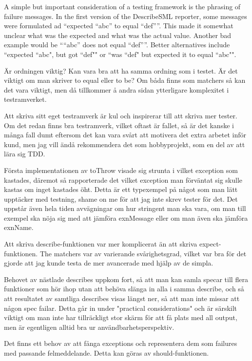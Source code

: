 \documentclass[11pt]{article}
\begin{document}
A simple but important consideration of a testing framework is the phrasing of failure messages. In the first version of the DescribeSML reporter, some messages were formulated ad ``expected ``abc'' to equal ``def''''. This made it somewhat unclear what was the expected and what was the actual value. Another bad example would be ````abc'' does not equal ``def''''. Better alternatives include ``expected ``abc", but got ``def"" or ``was ``def" but expected it to equal ``abc"".

Är ordningen viktig? Kan vara bra att ha samma ordning som i testet. Är det viktigt om man skriver to equal eller to be? Om båda finns som matchers så kan det vara viktigt, men då tillkommer å andra sidan ytterligare komplexitet i testramverket.

Att skriva sitt eget testramverk är kul och inspirerar till att skriva mer tester. Om det redan finns bra testramverk, vilket oftast är fallet, så är det kanske i många fall dumt eftersom det kan vara svårt att motivera det extra arbetet inför kund, men jag vill ändå rekommendera det som hobbyprojekt, som en del av att lära sig TDD.

Första implementationen av toThrow visade sig strunta i vilket exception som kastades, däremot så rapporterade det vilket exception man förväntat sig skulle kastas om inget kastades öht. Detta är ett typexempel på något som man lätt upptäcker med testning, shame on me för att jag inte skrev tester för det. Det uppstår även hela tiden avvägningar om hur stringent man ska vara, om man till exempel ska nöja sig med att jämföra exnMessage eller om man även ska jämföra exnName.

Att skriva describe-funktionen var mer komplicerat än att skriva expect-funktionen. The matchers var av varierande svårighetsgrad, vilket var bra för det gjorde att jag kunde testa de mer avancerade med hjälp av de simpla.

Behovet av nästlade describes uppkom fort, så att man kan samla specar till flera funktioner som hör ihop utan att behöva slänga in alla i samma describe, och så att resultatet av samtliga describes visas längst ner, så att man inte missar att någon spec failar. Detta går in under "practical considerations" och är särskilt viktigt om man inte har tillräckligt stor skärm för att få plats med all output, men är egentligen alltid bra ur användbarhetsperspektiv.

Det finns ett behov av att fånga exceptions och representera dem som failures med passande felmeddelande. Detta kan göras av should-funktionen.
\end{document}
